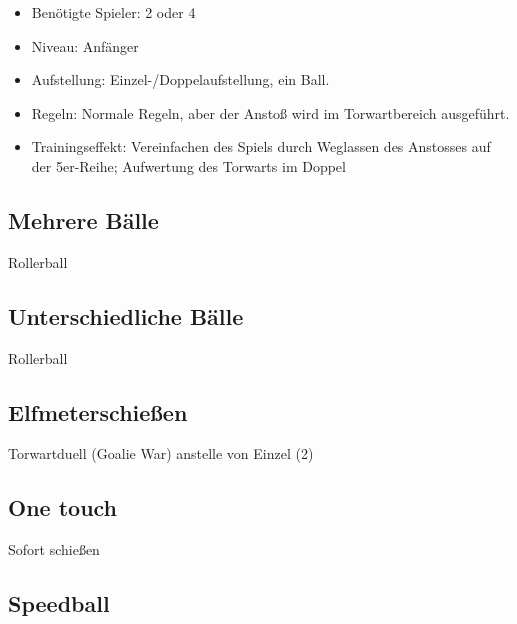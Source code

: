 \begin{itemize}
\item Benötigte Spieler: 2 oder 4 
\item Niveau: Anfänger
\item Aufstellung: Einzel-/Doppelaufstellung, ein Ball.
\item Regeln: Normale Regeln, aber der Anstoß wird im Torwartbereich ausgeführt. 
\item Trainingseffekt: Vereinfachen des Spiels durch Weglassen des Anstosses auf der 5er-Reihe; Aufwertung des Torwarts im Doppel
\end{itemize}

\subsection{Mehrere Bälle}
\label{spielformen:sonderregeln:unterschiedlichebaelle}
Rollerball

\subsection{Unterschiedliche Bälle}
\label{spielformen:sonderregeln:mehrerebaelle}
Rollerball


\subsection{Elfmeterschießen}
\label{spielformen:sonderregeln:elfemeter}
Torwartduell (Goalie War) anstelle von Einzel (2)

\subsection{One touch}
\label{spielformen:sonderregeln:onetouch}
Sofort schießen

\subsection{Speedball}
\label{spielformen:sonderregeln:speedball}

